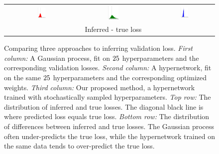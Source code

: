 \documentclass{article} %
\begin{document}
\begin{figure}
\begin{tabular}{@{\hskip3pt}c @{\hskip3pt}c @{\hskip3pt}c @{\hskip3pt}c}
	\rotatebox{90}{\,\,\,\,\,\,\,\,\,\,\,\,\,\,\, Frequency}&\includegraphics[width=0.14\textwidth]{ax0_hist.pdf}&\includegraphics[width=0.14\textwidth]{ax1_hist.pdf}&\includegraphics[width=0.14\textwidth]{ax2_hist.pdf}\\
	&&Inferred - true loss&\\
	\end{tabular}
	\caption{
	Comparing three approaches to inferring validation loss.
	\emph{First column:}
	{\color{red}A Gaussian process}, fit on $25$ hyperparameters and the corresponding validation losses.
	\emph{Second column:}
	{\color{green}A hypernetwork, fit on the same $25$ hyperparameters} and the corresponding optimized weights.
	\emph{Third column:}
	Our proposed method, {\color{blue}a hypernetwork trained with stochastically sampled hyperparameters}.
	\emph{Top row:}
	The distribution of inferred and true losses.
	The diagonal black line is where predicted loss equals true loss.
	\emph{Bottom row:}
	The distribution of differences between inferred and true losses.
	The Gaussian process often under-predicts the true loss, while the hypernetwork trained on the same data tends to over-predict the true loss.
	\label{fig:exp5}
	}
\end{figure}
\end{document}
